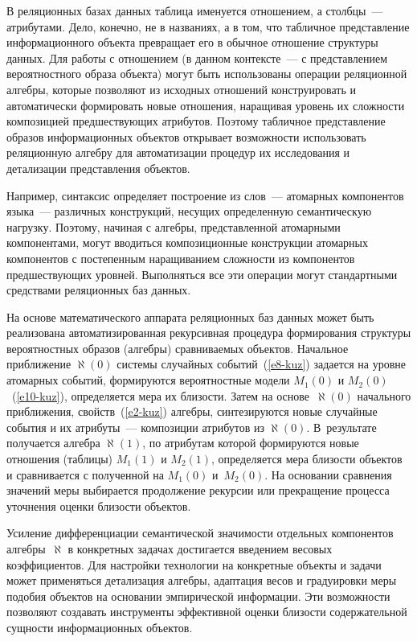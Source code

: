 \begin{multicols}{2}
  В реляционных базах данных таблица именуется отношением, а столбцы~---
атрибутами. Дело, конечно, не в названиях, а в том, что табличное
представление информационного объекта превращает его в обычное отношение
структуры данных. Для работы с отношением (в данном контексте~--- с
пред\-став\-ле\-ни\-ем вероятностного образа объекта) могут быть использованы
операции реляционной ал\-геб\-ры, которые позволяют из исходных отношений
конструировать и автоматически формировать новые отношения, наращивая
уровень их сложности композицией предшествующих атрибутов. Поэтому
табличное представление образов информационных объектов открывает
возможности использовать реляционную алгебру для автоматизации процедур
их исследования и детализации представления объектов.

  Например, синтаксис определяет построение из слов~--- атомарных
компонентов языка~--- различных конструкций, несущих определенную
семантическую нагрузку. Поэтому, начиная с алгебры, представленной
атомарными компонентами, могут вводиться композиционные конструкции
атомарных компонентов с постепенным наращиванием сложности из
компонентов предшествующих уровней. Выполняться все эти операции могут
стандартными средствами реляционных баз данных.

  На основе математического аппарата реляционных баз данных может быть
реализована автоматизированная рекурсивная процедура формирования
структуры вероятностных образов (алгебры) сравниваемых объектов.
Начальное приближение $\aleph (0)$ системы случайных
  событий~(\ref{e8-kuz}) задается на уровне атомарных событий, формируются
вероятностные модели $M_1(0)$ и $M_2(0)$~(\ref{e10-kuz}), определяется мера
их близости. Затем на основе~$\aleph (0)$ начального приближения,
свойств~(\ref{e2-kuz}) алгебры, синтезируются новые случайные события и их
атрибуты~--- композиции атрибутов из $\aleph (0)$. В~результате получается
алгебра $\aleph (1)$, по атрибутам которой формируются новые отношения
(таблицы) $M_1(1)$ и $M_2(1)$, определяется мера близости объектов и
сравнивается с полученной на $M_1(0)$ и~$M_2(0)$. На основании сравнения
значений меры выбирается продолжение рекурсии или прекращение процесса
уточнения оценки близости объектов.

  Усиление дифференциации семантической значимости отдельных
компонентов алгебры~$\aleph$ в конкретных задачах достигается введением
весовых коэффици\-ен\-тов. Для настройки технологии на конкретные объекты и
задачи может применяться детализация алгебры, адаптация весов и
градуировки меры подобия объектов на основании эмпирической информации.
Эти возможности позволяют создавать инструменты эффективной оценки
близости содержательной сущности информационных объектов.


\end{multicols}
